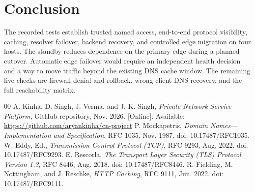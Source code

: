 \documentclass[conference]{IEEEtran}
\begin{document}
\newpage
\section{Conclusion}

The recorded tests establish trusted named access, end-to-end protocol
visibility, caching, resolver failover, backend recovery, and controlled edge
migration on four hosts. The standby reduces dependence on the primary edge
during a planned cutover. Automatic edge failover would require an independent
health decision and a way to move traffic beyond the existing DNS cache window.
The remaining live checks are firewall denial and rollback, wrong-client-DNS
recovery, and the full reachability matrix.

\begin{thebibliography}{00}
A. Kinha, D. Singh, J. Verma, and J. K. Singh,
\emph{Private Network Service Platform}, GitHub repository, Nov. 2026.
[Online]. Available: \url{https://github.com/aryankinha/cn-project}
P. Mockapetris, \emph{Domain Names---Implementation and Specification},
RFC 1035, Nov. 1987. doi: 10.17487/RFC1035.
W. Eddy, Ed., \emph{Transmission Control Protocol (TCP)},
RFC 9293, Aug. 2022. doi: 10.17487/RFC9293.
E. Rescorla, \emph{The Transport Layer Security (TLS) Protocol Version 1.3},
RFC 8446, Aug. 2018. doi: 10.17487/RFC8446.
R. Fielding, M. Nottingham, and J. Reschke,
\emph{HTTP Caching}, RFC 9111, Jun. 2022. doi: 10.17487/RFC9111.
\end{thebibliography}
\end{document}
